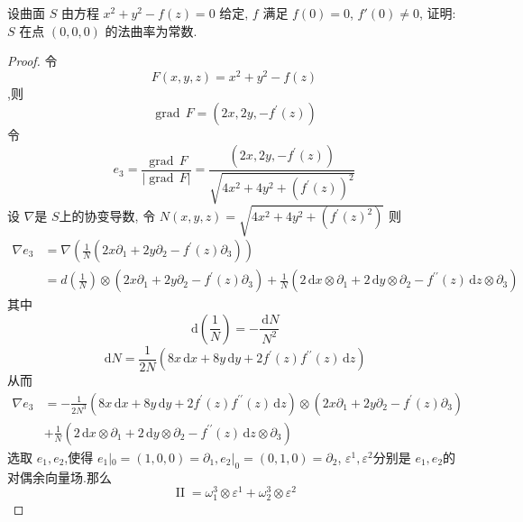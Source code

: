\documentclass[../../main.tex]{subfiles}
\begin{document}
\begin{problem}
设曲面 $S$ 由方程 $x^2 + y^2 - f(z) = 0$ 给定, $f$ 满足 $f(0) = 0$, $f'(0) \neq 0$, 证明: $S$ 在点 $(0,0,0)$ 的法曲率为常数.
\end{problem}
\begin{proof}
   令 \[
   F\left( x,y,z \right)= x^{2}+ y^{2}-f\left( z \right)  
   \],则 \[
    \operatorname{grad}\, F= \left( 2x,2y,-f^{\prime} \left( z \right)  \right) 
   \] 令 \[
   e_3= \frac{ \operatorname{grad}\,F }{\left| \operatorname{grad}\, F \right|  }= \frac{\left( 2x,2y,-f^{\prime} \left( z \right)  \right)  }{\sqrt{4x^{2}+ 4y^{2}+ \left( f^{\prime} \left( z \right)  \right)^{2} } }  
   \]设 \(   \nabla   \)是 \(  S  \)上的协变导数, 令 \(  N\left( x,y,z \right)= \sqrt{4x^{2}+ 4y^{2}+ \left( f^{\prime} \left( z \right)^{2}  \right) }   \) 
   则 \[
    \begin{aligned}
    \nabla e_3&=  \nabla \left( \frac{1}{N}\left( 2x \partial _{1}+ 2y \partial _{2}-f^{\prime} \left( z \right) \partial _{3}  \right)  \right) \\ 
     &= d\left( \frac{1 }{N }  \right)\otimes \left( 2x \partial _{1}+ 2y \partial _{2}-f^{\prime} \left( z \right) \partial _{3}  \right)+ \frac{1 }{N } \left( 2\,\mathrm{d} x\otimes  \partial _{1}+ 2\,\mathrm{d} y\otimes  \partial _{2}-f^{\prime \prime} \left( z \right)\,\mathrm{d} z\otimes  \partial _{3}  \right)     
    \end{aligned}
   \]其中 \[
   \,\mathrm{d} \left( \frac{1 }{N }  \right)= -\frac{\,\mathrm{d} N }{N^{2} }  
   \] \[
   \,\mathrm{d} N= \frac{1 }{2N }\left( 8x\,\mathrm{d} x+ 8y\,\mathrm{d} y+ 2f^{\prime} \left( z \right)f^{\prime \prime} \left( z \right)\,\mathrm{d} z   \right)  
   \]从而 \[
  \begin{aligned}
    \nabla e_3&= -\frac{1 }{2N^{3} }\left( 8x\,\mathrm{d} x+ 8y\,\mathrm{d} y+ 2f^{\prime} \left( z \right)f^{\prime \prime} \left( z \right)\,\mathrm{d} z   \right)\otimes \left( 2x \partial _{1}+ 2y \partial _{2}-f^{\prime} \left( z \right) \partial _{3}  \right)  \\ 
     & + \frac{1 }{N }\left( 2\,\mathrm{d} x\otimes  \partial _{1}+ 2\,\mathrm{d} y\otimes  \partial _{2}-f^{\prime \prime} \left( z \right)\,\mathrm{d} z\otimes  \partial _{3}  \right)  
  \end{aligned}
   \]选取 \(  e_1,e_2  \),使得 \(  e_1|_{0}= \left( 1,0,0 \right)=  \partial _{1}, e_2|_{0}= \left( 0,1,0 \right)  =  \partial _{2}  \), \(   \varepsilon ^{1}, \varepsilon ^{2}  \)分别是 \(  e_1,e_2  \)的对偶余向量场.那么 \[
   \operatorname{II} =  \omega _{1}^{3} \otimes \varepsilon ^{1}+  \omega _{2}^{3} \otimes \varepsilon ^{2}
\]
\end{proof}
\end{document}
